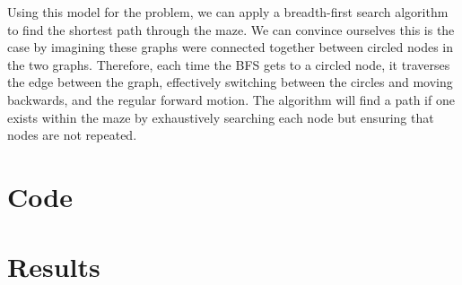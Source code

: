 \documentclass[12pt]{article}
\begin{document}
Using this model for the problem, we can apply a breadth-first search algorithm
to find the shortest path through the maze. We can convince ourselves this is
the case by imagining these graphs were connected together between circled nodes
in the two graphs. Therefore, each time the BFS gets to a circled node, it
traverses the edge between the graph, effectively switching between the circles
and moving backwards, and the regular forward motion. The algorithm will find a
path if one exists within the maze by exhaustively searching each node but
ensuring that nodes are not repeated.

\section{Code}

\section{Results}
\end{document}
